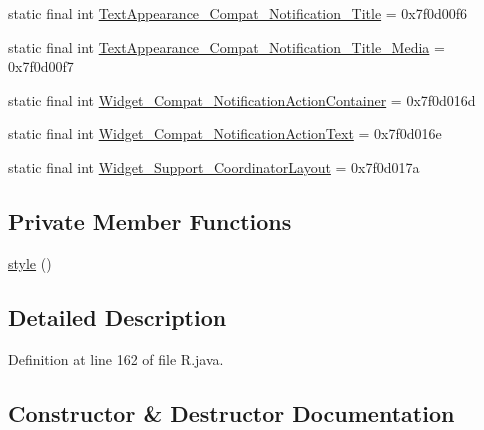 \begin{DoxyCompactItemize}
\item 
static final int \mbox{\hyperlink{classandroid_1_1support_1_1v4_1_1_r_1_1style_abd0415a4a076895003fdd5225714ac5e}{Text\+Appearance\+\_\+\+Compat\+\_\+\+Notification\+\_\+\+Title}} = 0x7f0d00f6
\item 
static final int \mbox{\hyperlink{classandroid_1_1support_1_1v4_1_1_r_1_1style_af43042c3c4d5c7ee7bf37d7e5d83a782}{Text\+Appearance\+\_\+\+Compat\+\_\+\+Notification\+\_\+\+Title\+\_\+\+Media}} = 0x7f0d00f7
\item 
static final int \mbox{\hyperlink{classandroid_1_1support_1_1v4_1_1_r_1_1style_ae7a59515daffd62d63d4d9475b90c375}{Widget\+\_\+\+Compat\+\_\+\+Notification\+Action\+Container}} = 0x7f0d016d
\item 
static final int \mbox{\hyperlink{classandroid_1_1support_1_1v4_1_1_r_1_1style_a51a891758c56519bd50080855ee1453b}{Widget\+\_\+\+Compat\+\_\+\+Notification\+Action\+Text}} = 0x7f0d016e
\item 
static final int \mbox{\hyperlink{classandroid_1_1support_1_1v4_1_1_r_1_1style_abc274aabfe5c00cd05caa1f05494654b}{Widget\+\_\+\+Support\+\_\+\+Coordinator\+Layout}} = 0x7f0d017a
\end{DoxyCompactItemize}
\subsection*{Private Member Functions}
\begin{DoxyCompactItemize}
\item 
\mbox{\hyperlink{classandroid_1_1support_1_1v4_1_1_r_1_1style_a09027d73371ca751f2e35804edd41533}{style}} ()
\end{DoxyCompactItemize}


\subsection{Detailed Description}


Definition at line 162 of file R.\+java.



\subsection{Constructor \& Destructor Documentation}
\mbox{\label{classandroid_1_1support_1_1v4_1_1_r_1_1style_a09027d73371ca751f2e35804edd41533}} 
